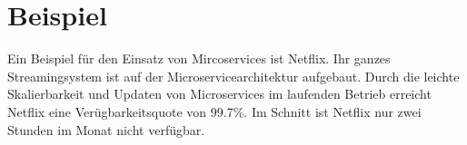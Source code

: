 \section{Beispiel}

Ein Beispiel für den Einsatz von Mircoservices ist Netflix. Ihr ganzes Streamingsystem ist auf der Microservicearchitektur aufgebaut. Durch die leichte Skalierbarkeit und Updaten von Microservices im laufenden Betrieb erreicht Netflix eine Verügbarkeitsquote von 99.7\%. Im Schnitt ist Netflix nur zwei Stunden im Monat nicht verfügbar.  